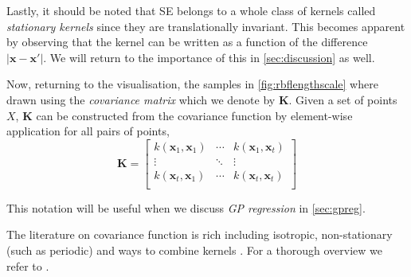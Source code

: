 \documentclass[conference,compsoc]{IEEEtran}
\theoremstyle{definition}
\begin{document}
            Lastly, it should be noted that SE belongs to a whole class of kernels called \emph{stationary kernels} since they are translationally invariant.
            This becomes apparent by observing that the kernel can be written as a function of the difference $|\bm{x}-\bm{x}'|$.
            We will return to the importance of this in \cref{sec:discussion} as well.

            Now, returning to the visualisation, the samples in \cref{fig:rbflengthscale} where drawn using the \emph{covariance matrix} which we denote by $\bm{K}$.
            Given a set of points $X$, $\bm{K}$ can be constructed from the covariance function by element-wise application for all pairs of points,
            \begin{equation}
                \bm{K} = \begin{bmatrix}
                k(\bm{x}_1, \bm{x}_1) & \cdots & k(\bm{x}_1, \bm{x}_t) \\
                \vdots & \ddots & \vdots \\
                k(\bm{x}_t, \bm{x}_1) & \cdots & k(\bm{x}_t, \bm{x}_t) \\
            \end{bmatrix}
            \end{equation}
            
            This notation will be useful when we discuss \emph{GP regression} in \cref{sec:gpreg}.

            The literature on covariance function is rich including isotropic, non-stationary (such as periodic) and ways to combine kernels \parencite{duvenaud_automatic_2014}.
            For a thorough overview we refer to \parencite[ch. 5]{rasmussen_gaussian_2006}.

            \begin{figure*}[t]
            \centering
            \begin{subfigure}[t]{0.31\textwidth}
                \centering
                
            \end{subfigure}
            \begin{subfigure}[t]{0.31\textwidth}
                \centering
                
            \end{subfigure}
            \begin{subfigure}[t]{0.31\textwidth}
                \centering
                
            \end{subfigure}
            \caption{Each plot contains 10 sampled functions drawn form a gaussian process prior with SE covariance function using a length scale of $0.2$, $0.05$ and $0.02$ from left to right. Notice how the length scale intuitively governs how quickly the function value changes.}
            \label{fig:rbflengthscale}
            \end{figure*}
\end{document}
